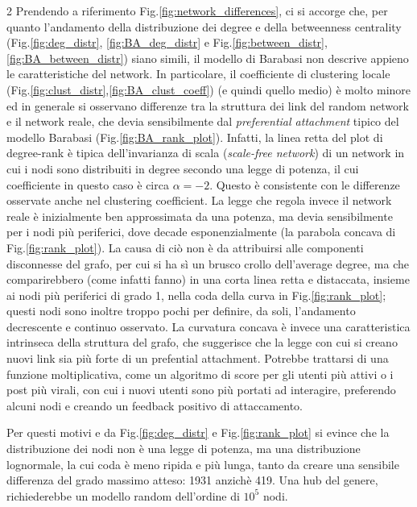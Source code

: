 \documentclass{article}
\begin{document}
\begin{multicols}{2}
Prendendo a riferimento Fig.\ref{fig:network_differences}, ci si accorge che, per quanto l'andamento della distribuzione dei degree
e della betweenness centrality (Fig.\ref{fig:deg_distr}, \ref{fig:BA_deg_distr} e Fig.\ref{fig:between_distr}, \ref{fig:BA_between_distr}) siano simili,
il modello di Barabasi non descrive appieno le caratteristiche del network.
In particolare, il coefficiente di clustering locale (Fig.\ref{fig:clust_distr},\ref{fig:BA_clust_coeff}) (e quindi quello medio) è
molto minore ed in generale si osservano differenze tra la struttura dei link del random network e il network reale, che devia
sensibilmente dal \textit{preferential attachment} tipico del modello Barabasi (Fig.\ref{fig:BA_rank_plot}).
Infatti, la linea retta del plot di degree-rank è tipica dell'invarianza di scala (\textit{scale-free network}) di un network in cui
i nodi sono distribuiti in degree secondo una legge di potenza, il cui coefficiente in questo caso è circa $\alpha=-2$.
Questo è consistente con le differenze osservate anche nel clustering coefficient.
La legge che regola invece il network reale è inizialmente ben approssimata da una potenza, ma devia sensibilmente per i nodi
più periferici, dove decade esponenzialmente (la parabola concava di Fig.\ref{fig:rank_plot}).
La causa di ciò non è da attribuirsi alle componenti disconnesse del grafo, per cui si ha sì un brusco crollo dell'average degree,
ma che comparirebbero (come infatti fanno) in una corta linea retta e distaccata, insieme ai nodi più periferici di grado 1, nella coda
della curva in Fig.\ref{fig:rank_plot}; questi nodi sono inoltre troppo pochi per definire, da soli, l'andamento decrescente e continuo osservato.
La curvatura concava è invece una caratteristica intrinseca della struttura del grafo, che suggerisce che la legge con cui si creano
nuovi link sia più forte di un prefential attachment.
Potrebbe trattarsi di una funzione moltiplicativa, come un algoritmo di score per gli utenti più attivi o i post più virali, con cui i nuovi 
utenti sono più portati ad interagire, preferendo alcuni nodi e creando un feedback positivo di attaccamento.

Per questi motivi e da Fig.\ref{fig:deg_distr} e Fig.\ref{fig:rank_plot} si evince che la distribuzione dei nodi non è una legge di potenza, ma una distribuzione lognormale,
la cui coda è meno ripida e più lunga, tanto da creare una sensibile differenza del grado massimo atteso: 1931 anzichè 419.
Una hub del genere, richiederebbe un modello random dell'ordine di $10^5$ nodi.
\end{multicols}
\end{document}
